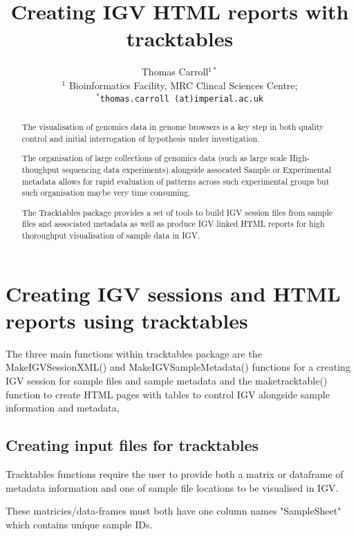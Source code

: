 \documentclass[12pt]{article}\usepackage[]{graphicx}\usepackage[usenames,dvipsnames]{color}
\author{Thomas Carroll$^{1*}$\\[1em] \small{$^{1}$ Bioinformatics Facility, MRC Clincal Sciences Centre;} \\ \small{\texttt{$^*$thomas.carroll (at)imperial.ac.uk}}}
\title{Creating IGV HTML reports with tracktables}
\begin{document}
\maketitle

\begin{abstract}
 
The visualisation of genomics data in genome browsers is a key step in both quality control and initial interrogation of hypothesis under investigation. 

The organisation of large collections of genomics data (such as large scale High-thoughput sequencing data experiments) alongside assocated Sample or Experimental metadata allows for rapid evaluation of patterns across such experimental groups but such organisation maybe very time consuming.

 The Tracktables package provides a set of tools to build IGV session files from sample files and associated metadata as well as produce IGV linked HTML reports for high thoroughput visualisation of sample data in IGV.
 
  \vspace{1em}
  
  \end{abstract}



\newpage

\tableofcontents

\section{Creating IGV sessions and HTML reports using tracktables}

The three main functions within tracktables package are the MakeIGVSessionXML() and  MakeIGVSampleMetadata() functions for a creating IGV session for sample files and sample metadata and the maketracktable() function to create HTML pages with tables to control IGV alongside sample information and metadata,

\subsection{Creating input files for tracktables}

Tracktables functions require the user to provide both a matrix or dataframe of metadata information and one of sample file locations to be visualised in IGV. 

These matricies/data-frames must both have one column names "SampleSheet" which contains unique sample IDs.
\end{document}
